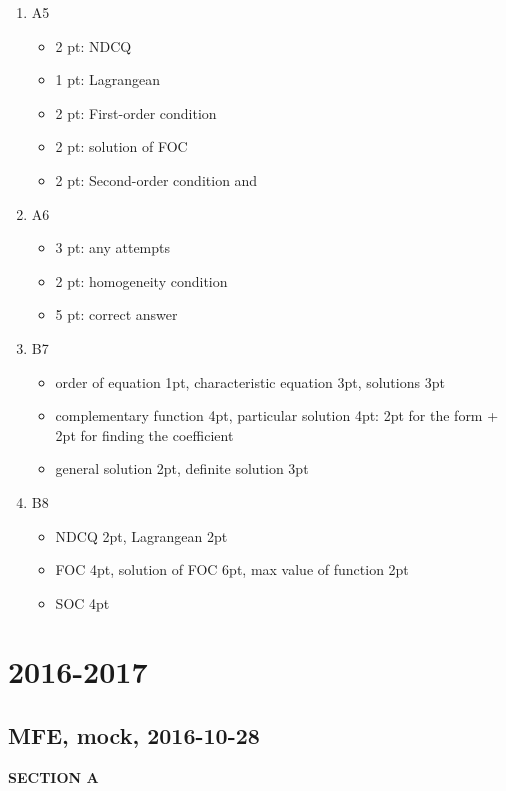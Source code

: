 \documentclass[12pt]{article} %
\theoremstyle{definition} %
\begin{document}
\begin{enumerate}
\item A5
\begin{itemize}
\item 2 pt: NDCQ
\item 1 pt: Lagrangean
\item 2 pt: First-order condition
\item 2 pt: solution of FOC
\item 2 pt: Second-order condition and
\end{itemize}

\item A6
\begin{itemize}
\item 3 pt: any attempts
\item 2 pt: homogeneity condition
\item 5 pt: correct answer
\end{itemize}


\item B7
\begin{itemize}
\item order of equation 1pt, characteristic equation 3pt, solutions 3pt
\item complementary function 4pt, particular solution 4pt: 2pt for the form + 2pt for finding the coefficient
\item general solution 2pt, definite solution 3pt
\end{itemize}

\item B8
\begin{itemize}
\item NDCQ 2pt, Lagrangean 2pt
\item FOC 4pt, solution of FOC 6pt, max value of function 2pt
\item SOC 4pt
\end{itemize}


\end{enumerate}


\section{2016-2017}


\subsection{MFE, mock, 2016-10-28}

\textbf{SECTION A}
\end{document}

